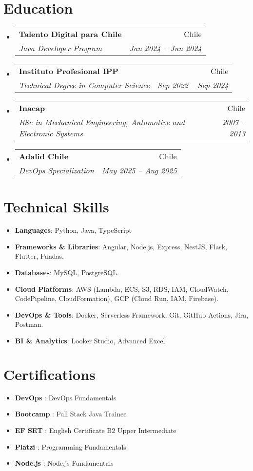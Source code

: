 \documentclass[letterpaper,11pt]{article}
\makeatletter
\newcommand{\resumeItem}[2]{
	\item\small{\textbf{#1} #2}
}
\newcommand{\resumeSubheading}[4]{
	\item
		\begin{tabular*}{\textwidth}{@{\extracolsep{\fill}}p{0.6\textwidth}r}
				\textbf{#1} & #2 \\
				\textit{\small #3} & \textit{\small #4} \\
		\end{tabular*}
}
\newcommand{\resumeSubItem}[2]{\resumeItem{#1}{#2}}
\newcommand{\resumeSubItemcol}[2]{\resumeItem{#1}{#2}}
\newcommand{\resumeSubHeadingListStart}{\begin{itemize}[leftmargin=0.2cm,label={}]}
\newcommand{\resumeSubHeadingListEnd}{\end{itemize}}
\makeatother
\begin{document}
\section{Education}
  \resumeSubHeadingListStart
    \resumeSubheading
      {Talento Digital para Chile}{Chile}
      {Java Developer Program}{Jan 2024 -- Jun 2024}
    \resumeSubheading
      {Instituto Profesional IPP}{Chile}
      {Technical Degree in Computer Science}{Sep 2022 -- Sep 2024}
    \resumeSubheading
      {Inacap}{Chile}
      {BSc in Mechanical Engineering, Automotive and Electronic Systems}{2007 -- 2013}
    \resumeSubheading
      {Adalid Chile}{Chile}
      {DevOps Specialization}{May 2025 -- Aug 2025}
  \resumeSubHeadingListEnd

\section{Technical Skills}
\resumeSubHeadingListStart
  \resumeSubItem{}{\textbf{Languages}{: Python, Java, TypeScript}}
  \resumeSubItem{}{\textbf{Frameworks \& Libraries}{: Angular, Node.js, Express, NestJS, Flask, Flutter, Pandas.}}
  \resumeSubItem{}{\textbf{Databases}{: MySQL, PostgreSQL.}}
  \resumeSubItem{}{\textbf{Cloud Platforms}{: AWS (Lambda, ECS, S3, RDS, IAM, CloudWatch, CodePipeline, CloudFormation), GCP (Cloud Run, IAM, Firebase).}}
  \resumeSubItem{}{\textbf{DevOps \& Tools}{: Docker, Serverless Framework, Git, GitHub Actions, Jira, Postman.}}
  \resumeSubItem{}{\textbf{BI \& Analytics}{: Looker Studio, Advanced Excel.}}
\resumeSubHeadingListEnd


\section{Certifications}
\resumeSubHeadingListStart
  \resumeSubItemcol{DevOps}{: DevOps Fundamentals}
  \resumeSubItemcol{Bootcamp}{: Full Stack Java Trainee}
  \resumeSubItemcol{EF SET}{: English Certificate B2 Upper Intermediate}
  \resumeSubItemcol{Platzi}{: Programming Fundamentals}
  \resumeSubItemcol{Node.js}{: Node.js Fundamentals}
\resumeSubHeadingListEnd
\end{document}
